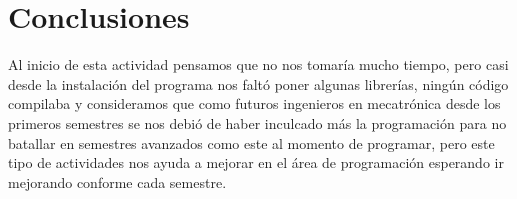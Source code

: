 \documentclass{article}
\begin{document}
\section{Conclusiones}
Al inicio de esta actividad pensamos que no nos tomaría mucho tiempo, pero casi desde la instalación del programa nos faltó poner algunas librerías, ningún código compilaba y consideramos que como futuros ingenieros en mecatrónica desde los primeros semestres se nos debió de haber inculcado más la programación para no batallar en semestres avanzados como este al momento de programar, pero este tipo de actividades nos ayuda a mejorar en el área de programación esperando ir mejorando conforme cada semestre. 



\end{document}
